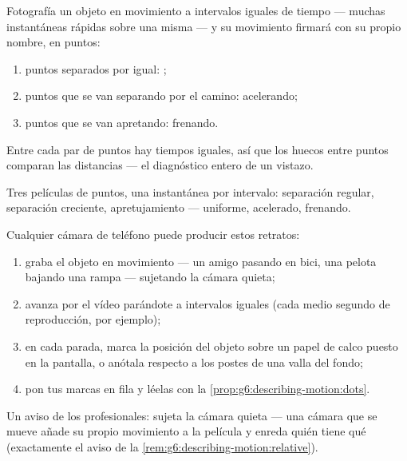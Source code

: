 \begin{proposition}\label{prop:g6:describing-motion:dots}
Fotografía un objeto en movimiento a intervalos iguales de tiempo ---
muchas instantáneas rápidas sobre una misma  --- y su
movimiento firmará con su propio nombre, en puntos:
\begin{enumerate}
  \item puntos separados por igual: ;
  \item puntos que se van separando por el camino: acelerando;
  \item puntos que se van apretando: frenando.
\end{enumerate}
Entre cada par de puntos hay tiempos iguales, así que los huecos entre
puntos comparan las distancias --- el diagnóstico entero de un
vistazo.
\end{proposition}

\begin{omfigure}

{\small Tres películas de puntos, una instantánea por intervalo:
separación regular, separación creciente, apretujamiento ---
uniforme, acelerado, frenando.}
\end{omfigure}

\begin{method}\label{met:g6:describing-motion:film}
Cualquier cámara de teléfono puede producir estos retratos:
\begin{enumerate}
  \item graba el objeto en movimiento --- un amigo pasando en bici,
        una pelota bajando una rampa --- sujetando la cámara quieta;
  \item avanza por el vídeo parándote a intervalos iguales (cada
        medio segundo de reproducción, por ejemplo);
  \item en cada parada, marca la posición del objeto sobre un papel
        de calco puesto en la pantalla, o anótala respecto a los
        postes de una valla del fondo;
  \item pon tus marcas en fila y léelas con la
        \cref{prop:g6:describing-motion:dots}.
\end{enumerate}
Un aviso de los profesionales: sujeta la cámara quieta --- una cámara
que se mueve añade su propio movimiento a la película y enreda quién
tiene qué  (exactamente el aviso de la
\cref{rem:g6:describing-motion:relative}).
\end{method}

